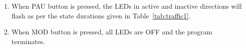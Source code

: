 \begin{enumerate}
\item When PAU button is pressed, the LEDs in active and inactive directions
  will flash as per the state durations given in Table~\ref{tab:traffic1}.
\item When MOD button is pressed, all LEDs are OFF and the program terminates.
\end{enumerate}
 

